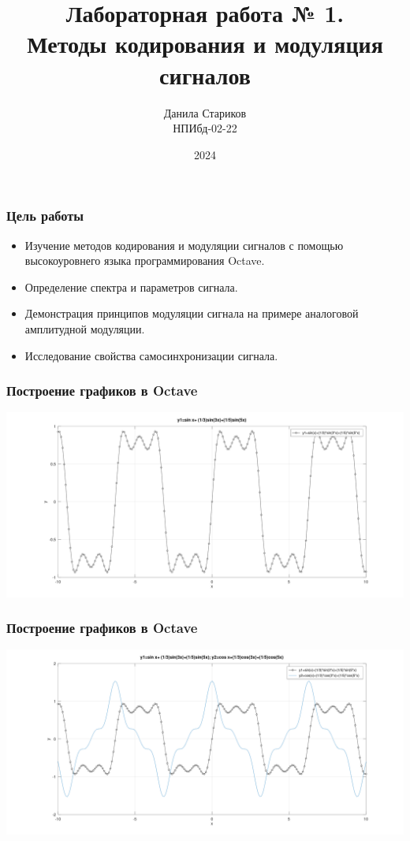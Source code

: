 

\title{Лабораторная работа № 1. \\ Методы кодирования и модуляция сигналов}
\author{Данила Стариков \\ НПИбд-02-22}
\date{2024}



\frame{\titlepage}

\begin{frame}
\frametitle{Цель работы}
\begin{itemize}
    \item Изучение методов кодирования и модуляции сигналов с помощью высокоуровнего языка программирования Octave.
    \item Определение спектра и параметров сигнала.
    \item Демонстрация принципов модуляции сигнала на примере аналоговой амплитудной модуляции.
    \item Исследование свойства самосинхронизации сигнала.
\end{itemize}
\end{frame}

\begin{frame}
\frametitle{Построение графиков в Octave}
    \includegraphics[width=\textwidth]{../octave/plot-sin.png}
\end{frame}

\begin{frame}
\frametitle{Построение графиков в Octave}
    \includegraphics[width=\textwidth]{../octave/plot-sincos.png}
\end{frame}

